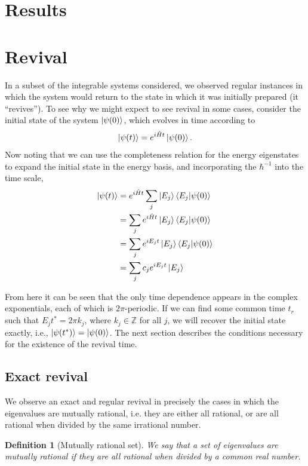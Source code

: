 \documentclass[a4paper, 10pt, draft]{article}
\theoremstyle{plain}
\newtheorem{definition}[]{Definition}
\begin{document}
\section{Results}

\section{Revival \label{revival}}

In a subset of the integrable systems considered, we observed regular instances
in which the system would return to the state in which it was initially
prepared (it ``revives''). To see why we might expect to see revival in
some cases, consider the initial state of the system $\ket{\psi(0)}$, which
evolves in time according to
\begin{equation}
 \ket{\psi(t)}=e^{i\hat{H}t}\ket{\psi(0)}.
\end{equation}
Now noting that we can use the completeness relation for the energy eigenstates
to expand the initial state in the energy basis, and incorporating the
$\hbar^{-1}$ into the time scale,
\begin{align}
\label{time_evolution}
 \ket{\psi(t)} &= e^{i\hat{H}t}\sum_j\ket{E_j}\braket{E_j|\psi(0)}  \nonumber \\
               &= \sum_je^{i\hat{H}t}\ket{E_j}\braket{E_j|\psi(0)}  \nonumber \\
               &= \sum_je^{iE_{j}t}\ket{E_j}\braket{E_j|\psi(0)}    \nonumber \\
               &= \sum_j c_{j}e^{iE_{j}t}\ket{E_j}
\end{align}

From here it can be seen that the only time dependence appears in the complex
exponentials, each of which is $2\pi$-periodic. If we can find some common
time $t_r$ such that $E_{j} t^*=2 \pi k_{j}$, where $k_{j} \in \mathbb{Z} $
for all $j$, we will recover the initial state exactly, i.e.,
$\ket{\psi(t^*)}=\ket{\psi(0)}$. The next section describes the conditions
necessary for the existence of the revival time.\\


\subsection{Exact revival}

We observe an exact and regular revival in precisely the cases in which the
eigenvalues are mutually rational, i.e. they are either all rational, or are all
rational when divided by the same irrational number.
\begin{definition}[Mutually rational set]
    We say that a set of eigenvalues are mutually rational if they are all
    rational when divided by a common real number.
\end{definition}
\end{document}
